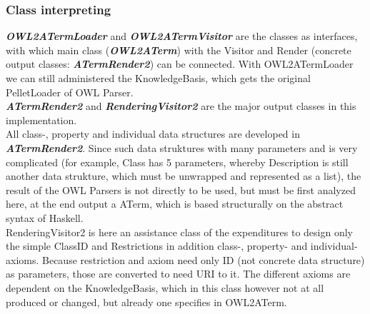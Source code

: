 \documentclass[11pt,a4paper]{article}
\begin{document}
\subsubsection{Class interpreting}
\textbf{\emph{OWL2ATermLoader} }and \textbf{\emph{OWL2ATermVisitor}} are the classes as interfaces, with which main class (\textbf{\emph{OWL2ATerm}}) with the Visitor and Render (concrete output classes: \textbf{\emph{ATermRender2}}) can be connected. With OWL2ATermLoader we can still administered the KnowledgeBasis, which gets the original PelletLoader of OWL Parser.\\
   
\textbf{\emph{ATermRender2}} and \textbf{\emph{RenderingVisitor2}} are the major output classes in this implementation.\\

All class-, property and individual data structures are developed in \textbf{\emph{ATermRender2}}.  Since such data struktures with many parameters and is very complicated (for example, Class has 5 parameters, whereby Description is still another data strukture, which must be unwrapped and represented as a list), the result of the OWL Parsers is not directly to be used, but must be first analyzed here, at the end output a ATerm, which is based structurally on the abstract syntax of Haskell.\\

RenderingVisitor2 is here an assistance class of the expenditures to design only the simple ClassID and Restrictions in addition class-, property- and individual- axioms.  Because restriction and axiom need only ID (not concrete data structure) as parameters, those are converted to need URI to it.  The different axioms are dependent on the KnowledgeBasis, which in this class however not at all produced or changed, but already one specifies in OWL2ATerm.\\
\end{document}
